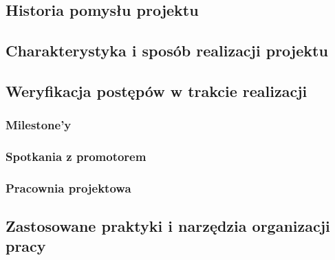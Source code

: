 \chapter{\ChapterTitleWorkOrganization}
\label{sec:organizacja-pracy}

\section{Historia pomysłu projektu}


\section{Charakterystyka i sposób realizacji projektu}


\section{Weryfikacja postępów w trakcie realizacji}

\subsection{Milestone'y}

\subsection{Spotkania z promotorem}

\subsection{Pracownia projektowa}


\section{Zastosowane praktyki i narzędzia organizacji pracy}

